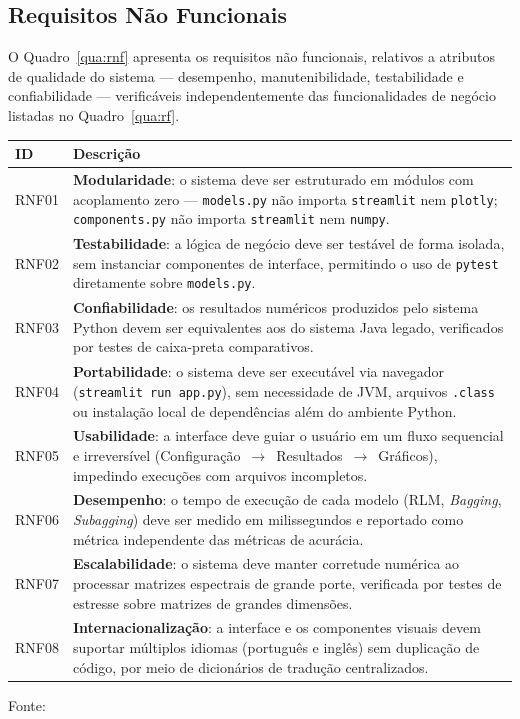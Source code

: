 \subsection{Requisitos Não Funcionais}

O Quadro~\ref{qua:rnf} apresenta os requisitos não funcionais, relativos a atributos de
qualidade do sistema — desempenho, manutenibilidade, testabilidade e confiabilidade —
verificáveis independentemente das funcionalidades de negócio listadas no
Quadro~\ref{qua:rf}.

\begin{quadro}[H]
\centering
\caption{Requisitos não funcionais do sistema}
\label{qua:rnf}
\begin{tabularx}{\textwidth}{|l|X|}
\hline
\textbf{ID} & \textbf{Descrição} \\ \hline
RNF01 & \textbf{Modularidade}: o sistema deve ser estruturado em módulos com acoplamento
zero — \texttt{models.py} não importa \texttt{streamlit} nem \texttt{plotly};
\texttt{components.py} não importa \texttt{streamlit} nem \texttt{numpy}. \\ \hline
RNF02 & \textbf{Testabilidade}: a lógica de negócio deve ser testável de forma isolada,
sem instanciar componentes de interface, permitindo o uso de \texttt{pytest} diretamente
sobre \texttt{models.py}. \\ \hline
RNF03 & \textbf{Confiabilidade}: os resultados numéricos produzidos pelo sistema Python
devem ser equivalentes aos do sistema Java legado, verificados por testes de caixa-preta
comparativos. \\ \hline
RNF04 & \textbf{Portabilidade}: o sistema deve ser executável via navegador
(\texttt{streamlit run app.py}), sem necessidade de JVM, arquivos \texttt{.class} ou
instalação local de dependências além do ambiente Python. \\ \hline
RNF05 & \textbf{Usabilidade}: a interface deve guiar o usuário em um fluxo sequencial e
irreversível (Configuração~$\rightarrow$~Resultados~$\rightarrow$~Gráficos), impedindo
execuções com arquivos incompletos. \\ \hline
RNF06 & \textbf{Desempenho}: o tempo de execução de cada modelo (RLM, \textit{Bagging},
\textit{Subagging}) deve ser medido em milissegundos e reportado como métrica
independente das métricas de acurácia. \\ \hline
RNF07 & \textbf{Escalabilidade}: o sistema deve manter corretude numérica ao processar
matrizes espectrais de grande porte, verificada por testes de estresse sobre matrizes de
grandes dimensões. \\ \hline
RNF08 & \textbf{Internacionalização}: a interface e os componentes visuais devem suportar
múltiplos idiomas (português e inglês) sem duplicação de código, por meio de dicionários
de tradução centralizados. \\ \hline
\end{tabularx}
\begin{tablenotes}[flushleft]
\footnotesize
\item Fonte:~\oautor
\end{tablenotes}
\end{quadro}

